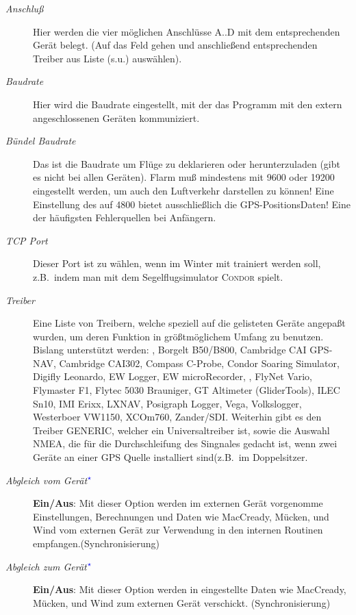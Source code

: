 \begin{description}
\item[\textit{Anschluß}]  Hier werden die vier möglichen Anschlüsse A..D mit dem entsprechenden Gerät belegt. (Auf das Feld gehen und anschließend entsprechenden Treiber aus Liste (s.u.) auswählen).
\item[\textit{Baudrate}]  Hier wird die Baudrate eingestellt, mit der das Programm mit den extern angeschlossenen Geräten kommuniziert.
\item[\textit{Bündel Baudrate}]  Das ist die Baudrate um Flüge zu deklarieren oder herunterzuladen (gibt es nicht bei allen Geräten).
\achtung Flarm muß  mindestens mit 9600 oder 19200 eingestellt werden, um auch den Luftverkehr darstellen zu können! Eine Einstellung des \fl auf 4800 bietet ausschließlich die GPS-PositionsDaten! Eine der häufigsten  Fehlerquellen bei Anfängern.
\item[\textit{TCP Port}]  Dieser Port ist zu wählen, wenn  im Winter mit \xc trainiert werden soll, z.B.\ indem man  mit dem
Segelflugsimulator \textsc{Condor} spielt.
\item[\textit{Treiber}] Eine Liste von Treibern, welche speziell auf die gelisteten Geräte angepaßt wurden, um deren Funktion in größtmöglichem Umfang zu benutzen.
Bislang unterstützt werden: \al, Borgelt B50/B800, Cambridge CAI GPS-NAV, Cambridge CAI302, Compass C-Probe, Condor Soaring Simulator, Digifly Leonardo,  EW Logger, EW microRecorder,
\fl, FlyNet Vario, Flymaster F1, Flytec 5030 Brauniger, GT Altimeter (GliderTools), ILEC Sn10, IMI Erixx, LXNAV, Posigraph Logger, Vega, Volkslogger, Westerboer VW1150, XCOm760, Zander/SDI.
Weiterhin gibt es den Treiber GENERIC, welcher ein Universaltreiber ist, sowie die Auswahl NMEA, die für die Durchschleifung des Singnales gedacht ist, wenn zwei Geräte an einer GPS Quelle installiert sind(z.B.\ im Doppelsitzer.
\item[\textit{Abgleich vom Gerät$^{\textcolor{blue}{\star}}$}]  {\bf Ein/Aus}: Mit dieser Option werden im externen Gerät vorgenomme Einstellungen, Berechnungen und Daten wie MacCready, Mücken, und Wind vom externen Gerät zur Verwendung in den internen Routinen empfangen.(Synchronisierung)
\item[\textit{Abgleich zum Gerät$^{\textcolor{blue}{\star}}$}]  {\bf Ein/Aus}: Mit dieser Option werden in \xc eingestellte Daten wie MacCready, Mücken, und Wind zum externen Gerät verschickt. (Synchronisierung)
\end{description}


